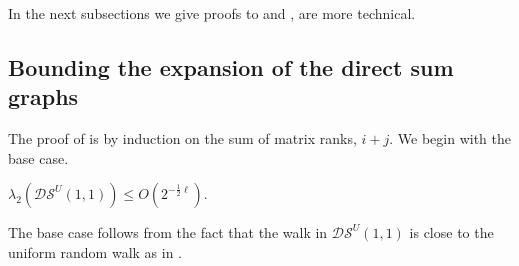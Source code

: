 In the next subsections we give proofs to  and , are more technical.
\subsection{Bounding the expansion of the direct sum graphs}
The proof of  is by induction on the sum of matrix ranks, \(i+j\). We begin with the base case.
\begin{claim} \label{claim:base-case}
    \(\lambda_2(\mathcal{DS}^U(1,1))\leq O(2^{-\frac{1}{2}\ell})\).
\end{claim}

The base case follows from the fact that the walk in \(\mathcal{DS}^U(1,1)\) is close to the uniform random walk as in .
